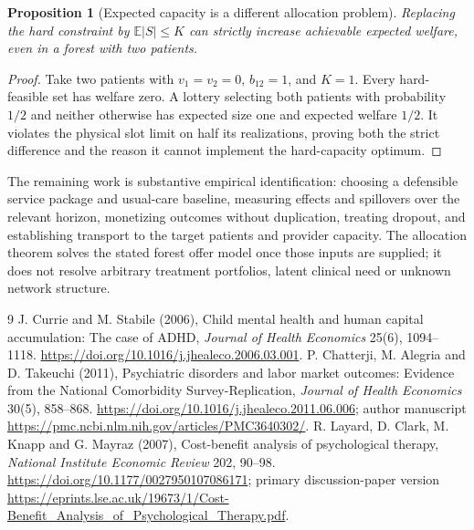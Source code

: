 \documentclass[11pt]{article}
\newtheorem{proposition}[theorem]{Proposition}
\theoremstyle{remark}\newtheorem{remark}[theorem]{Remark}
\newcommand{\E}{\mathbb E}
\begin{document}
\begin{proposition}[Expected capacity is a different allocation problem]
Replacing the hard constraint by $\E|S|\le K$ can strictly increase achievable expected welfare, even in a forest with two patients.
\end{proposition}
\begin{proof}
Take two patients with $v_1=v_2=0$, $b_{12}=1$, and $K=1$. Every hard-feasible set has welfare zero. A lottery selecting both patients with probability $1/2$ and neither otherwise has expected size one and expected welfare $1/2$. It violates the physical slot limit on half its realizations, proving both the strict difference and the reason it cannot implement the hard-capacity optimum.
\end{proof}

The remaining work is substantive empirical identification: choosing a defensible service package and usual-care baseline, measuring effects and spillovers over the relevant horizon, monetizing outcomes without duplication, treating dropout, and establishing transport to the target patients and provider capacity. The allocation theorem solves the stated forest offer model once those inputs are supplied; it does not resolve arbitrary treatment portfolios, latent clinical need or unknown network structure.

\begin{thebibliography}{9}
 J. Currie and M. Stabile (2006), Child mental health and human capital accumulation: The case of ADHD, \emph{Journal of Health Economics} 25(6), 1094--1118. \url{https://doi.org/10.1016/j.jhealeco.2006.03.001}.
 P. Chatterji, M. Alegria and D. Takeuchi (2011), Psychiatric disorders and labor market outcomes: Evidence from the National Comorbidity Survey-Replication, \emph{Journal of Health Economics} 30(5), 858--868. \url{https://doi.org/10.1016/j.jhealeco.2011.06.006}; author manuscript \url{https://pmc.ncbi.nlm.nih.gov/articles/PMC3640302/}.
 R. Layard, D. Clark, M. Knapp and G. Mayraz (2007), Cost-benefit analysis of psychological therapy, \emph{National Institute Economic Review} 202, 90--98. \url{https://doi.org/10.1177/0027950107086171}; primary discussion-paper version \url{https://eprints.lse.ac.uk/19673/1/Cost-Benefit_Analysis_of_Psychological_Therapy.pdf}.
\end{thebibliography}
\end{document}
